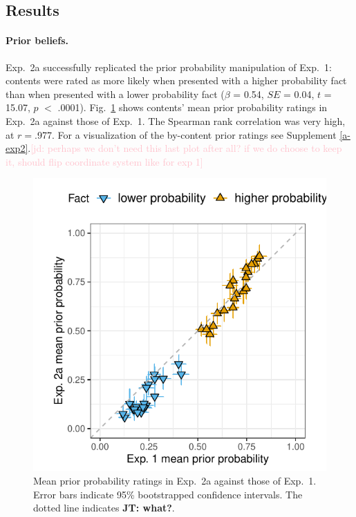 \documentclass[11pt,fleqn]{article}
\newcommand{\jd}[1]{\textcolor{Pink}{[jd: #1]}}
\newcommand{\jt}[1]{\textbf{\color{blue}JT: #1}}
\newcommand{\figref}[1]{Fig.~\ref{#1}}
\newcommand{\6}{\mbox{$[\hspace*{-.6mm}[$}}
\newcommand{\9}{\mbox{$]\hspace*{-.6mm}]$}}
\begin{document}
\subsection{Results}

\paragraph{Prior beliefs.} Exp.~2a successfully replicated the prior probability manipulation of Exp.~1: contents were rated as more likely when presented with a higher probability fact than when  presented with a lower probability fact ($\beta$ = 0.54, $SE$ = 0.04, $t$ = 15.07, $p$ $<$ .0001).  \figref{f-prior-comparison} shows contents' mean prior probability ratings in Exp.~2a against those of Exp.~1. The Spearman rank correlation was very high, at $r=$.977. For a visualization of the by-content prior ratings see Supplement \ref{a-exp2}.\jd{perhaps we don't need this last plot after all? if we do choose to keep it, should flip coordinate system like for exp 1}

\begin{figure}[h!]
\centering

\includegraphics[width=.4\paperwidth]{../../results/1-prior/graphs/prior-probability-comparison-exp1-exp2}

\caption{Mean prior probability ratings in Exp.~2a against those of Exp.~1. Error bars indicate 95\% bootstrapped confidence intervals. The dotted line indicates \jt{what?}.}
\label{f-prior-comparison}
\end{figure}
\end{document}
